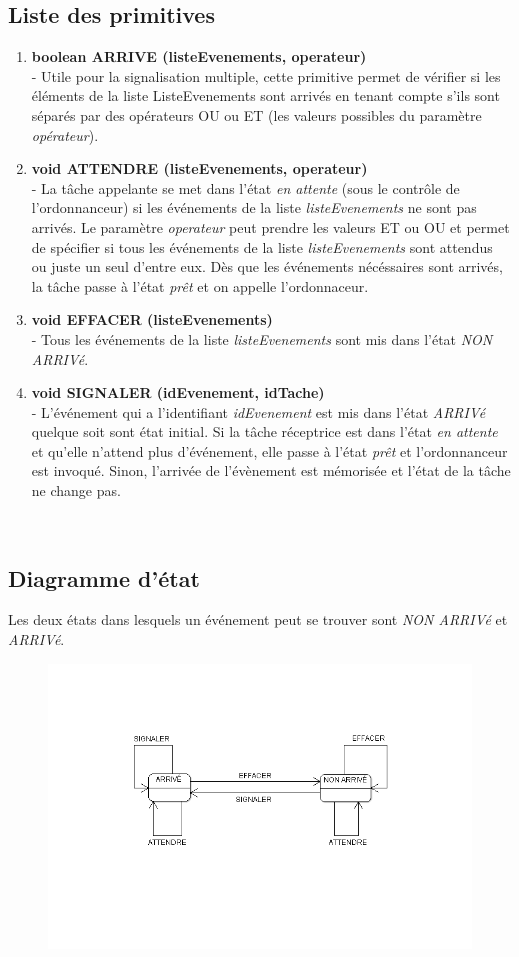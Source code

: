 \subsection{Liste des primitives}
\begin{enumerate}
   \item \textbf{boolean ARRIVE (listeEvenements, operateur)}
	~\\ - Utile pour la signalisation multiple, cette primitive permet de
	vérifier si les éléments de la liste ListeEvenements sont arrivés en tenant
	compte s'ils sont séparés par des opérateurs OU ou ET (les valeurs possibles
	du paramètre \textit{opérateur}).
   \item \textbf{void ATTENDRE (listeEvenements, operateur)}
	~\\ - La tâche appelante se met dans l'état \textit{en attente}
	 (sous le contrôle de l'ordonnanceur) si les événements de la liste
	 \textit{listeEvenements} ne sont pas arrivés. 
	 Le paramètre \textit{operateur} peut prendre les valeurs ET ou OU et 
	 permet de spécifier si tous les événements de la liste
	 \textit{listeEvenements} sont attendus ou juste un seul d'entre eux. 
	 Dès que les événements nécéssaires sont arrivés, la tâche passe à l'état
	 \textit{prêt} et on appelle l'ordonnaceur.
   \item \textbf{void EFFACER (listeEvenements)}
	~\\ - Tous les événements de la liste \textit{listeEvenements} sont
		mis dans l'état \textit{NON ARRIVé}.
	\item \textbf{void SIGNALER (idEvenement, idTache)}
	~\\ - L'événement qui a l'identifiant \textit{idEvenement} est mis dans l'état
	\textit{ARRIVé} quelque soit sont état initial. 
	Si la tâche réceptrice est dans l'état \textit{en attente} et qu'elle n'attend
	plus d'événement, elle passe à l'état \textit{prêt} et l'ordonnanceur est invoqué. 
	Sinon, l'arrivée de l'évènement est mémorisée et l'état de la tâche ne change pas.
\end{enumerate}
~\\
\newpage
\subsection{Diagramme d'état}
Les deux états dans lesquels un événement peut se trouver sont \textit{NON
ARRIVé} et \textit{ARRIVé}.

\begin{figure} [htp]
\centering
\includegraphics[width=\textwidth]{img/EtatsEvenement.png}
\end{figure}
